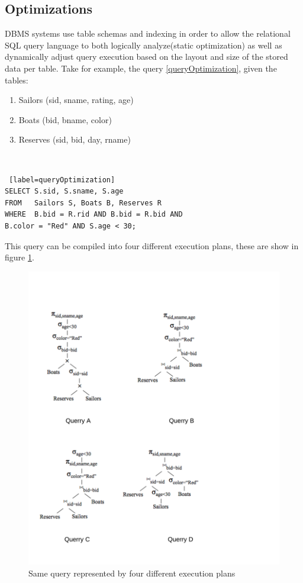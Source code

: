 \documentclass[10pt,twocolumn]{IEEEtran11}
\begin{document}
\subsection{Optimizations}
DBMS systems use table schemas and indexing in order to allow the relational SQL query language to both logically analyze(static optimization) as well as dynamically adjust query execution based on the layout and size of the stored data per table. Take for example, the query \ref{queryOptimization}, given the tables:
\  \\
\begin{enumerate}
	\setlength\itemsep{1em}
	\item Sailors (sid, sname, rating, age)
	\item Boats (bid, bname, color)
	\item Reserves (sid, bid, day, rname)
\end{enumerate}
\  \\
\begin{lstlisting} [label=queryOptimization]
SELECT S.sid, S.sname, S.age
FROM   Sailors S, Boats B, Reserves R
WHERE  B.bid = R.rid AND B.bid = R.bid AND
B.color = "Red" AND S.age < 30;
\end{lstlisting}

This query can be compiled into four different execution plans, these are show in figure \ref{fig:queryExecutionPlan}.

\begin{figure}[h]
	\centering
	\includegraphics[scale=0.90]{images/logicalExecution.png}
	\caption{Same query represented by four different execution plans \protect\cite{LectureDB}}
	\label{fig:queryExecutionPlan}
\end{figure}
\end{document}
